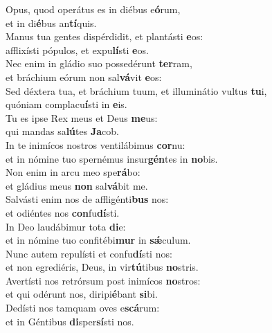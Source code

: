 \evenverse Opus, quod operátus es in diébus e\textbf{ó}rum,~\*\\
\evenverse et in di\textbf{é}bus an\textbf{tí}quis.\\
\oddverse Manus tua gentes dispérdidit, et plantásti \textbf{e}os:~\*\\
\oddverse afflixísti pópulos, et expu\textbf{lí}sti \textbf{e}os.\\
\evenverse Nec enim in gládio suo possedérunt \textbf{ter}ram,~\*\\
\evenverse et bráchium eórum non sal\textbf{vá}vit \textbf{e}os:\\
\oddverse Sed déxtera tua, et bráchium tuum, et illuminátio vultus \textbf{tu}i,~\*\\
\oddverse quóniam complacu\textbf{í}sti in \textbf{e}is.\\
\evenverse Tu es ipse Rex meus et Deus \textbf{me}us:~\*\\
\evenverse qui mandas sa\textbf{lú}tes \textbf{Ja}cob.\\
\oddverse In te inimícos nostros ventilábimus \textbf{cor}nu:~\*\\
\oddverse et in nómine tuo spernémus insur\textbf{gén}tes in \textbf{no}bis.\\
\evenverse Non enim in arcu meo spe\textbf{rá}bo:~\*\\
\evenverse et gládius meus \textbf{non} sal\textbf{vá}bit me.\\
\oddverse Salvásti enim nos de affligénti\textbf{bus} nos:~\*\\
\oddverse et odiéntes nos \textbf{con}fu\textbf{dí}sti.\\
\evenverse In Deo laudábimur tota \textbf{di}e:~\*\\
\evenverse et in nómine tuo confitébi\textbf{mur} in \textbf{sǽ}culum.\\
\oddverse Nunc autem repulísti et confu\textbf{dí}sti nos:~\*\\
\oddverse et non egrediéris, Deus, in vir\textbf{tú}tibus \textbf{no}stris.\\
\evenverse Avertísti nos retrórsum post inimícos \textbf{no}stros:~\*\\
\evenverse et qui odérunt nos, diripi\textbf{é}bant \textbf{si}bi.\\
\oddverse Dedísti nos tamquam oves e\textbf{scá}rum:~\*\\
\oddverse et in Géntibus \textbf{di}sper\textbf{sí}sti nos.\\
